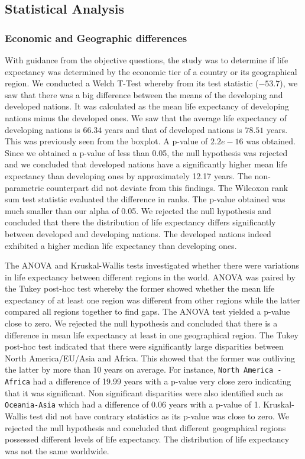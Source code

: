 \documentclass[3pt, a4paper]{article}
\begin{document}
\subsection{Statistical Analysis}
\subsubsection{Economic and Geographic differences}
With guidance from the objective questions, the study was to determine if life expectancy was determined by the economic tier of a country or its geographical region. We conducted a Welch T-Test whereby from its test statistic ($-53.7$), we saw that there was a big difference between the means of the developing and developed nations. It was calculated as the mean life expectancy of developing nations minus the developed ones. We saw that the average life expectancy of developing nations is $66.34$ years and that of developed nations is $78.51$ years. This was previously seen from the boxplot. A p-value of $2.2e-16$ was obtained. Since we obtained a p-value of less than 0.05, the null hypothesis was rejected and we concluded that developed nations have a significantly higher mean life expectancy than developing ones by approximately 12.17 years. The non-parametric counterpart did not deviate from this findings. The  Wilcoxon rank sum test statistic evaluated the difference in ranks. The p-value obtained was much smaller than our alpha of 0.05. We rejected the null hypothesis and concluded that there the distribution of life expectancy differs significantly between developed and developing nations. The developed nations indeed exhibited a higher median life expectancy than developing ones.

The ANOVA and Kruskal-Wallis tests investigated whether there were variations in life expectancy between different regions in the world. ANOVA was paired by the Tukey post-hoc test whereby the former showed whether the mean life expectancy of at least one region was different from other regions while the latter compared all regions together to find gaps. The ANOVA test yielded a p-value close to zero. We rejected the null hypothesis and concluded that there is a difference in mean life expectancy at least in one geographical region. The Tukey post-hoc test indicated that there were significantly large disparities between North America/EU/Asia and Africa.  This showed that the former was outliving the latter by more than 10 years on average. For instance, \texttt{North America - Africa} had a difference of 19.99 years with a p-value very close zero indicating that it was significant. Non significant disparities were also identified such as \texttt{Oceania-Asia} which had a difference of 0.06 years with a p-value of 1. Kruskal-Wallis test did not have contrary statistics as its p-value was close to zero. We rejected the null hypothesis and concluded that different geographical regions possessed different levels of life expectancy. The distribution of life expectancy was not the same worldwide.
\end{document}
